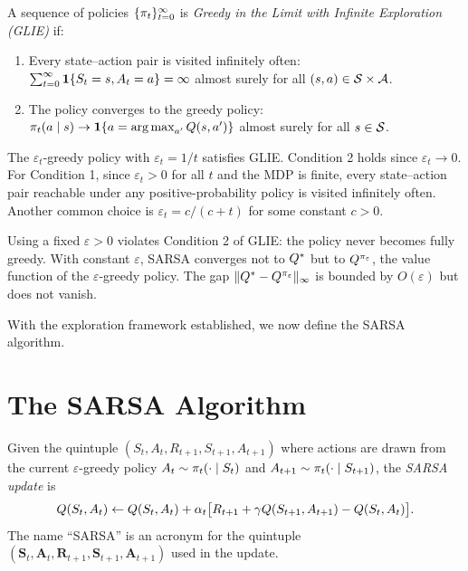\documentclass[11pt,a4paper]{article}
\begin{document}
\begin{definition}
\label{def:glie}
A sequence of policies $\{\pi_t\}_{t=0}^\infty$ is
\emph{Greedy in the Limit with Infinite Exploration (GLIE)} if:
\begin{enumerate}[nosep]
  \item Every state--action pair is visited infinitely often:
    $\sum_{t=0}^\infty \mathbf{1}\{S_t = s, A_t = a\} = \infty$
    almost surely for all $(s,a) \in \mathcal{S} \times \mathcal{A}$.
  \item The policy converges to the greedy policy:
    $\pi_t(a \mid s) \to \mathbf{1}\{a = \operatorname{arg\,max}_{a'} Q(s,a')\}$
    almost surely for all $s \in \mathcal{S}$.
\end{enumerate}
\end{definition}

\begin{example}
\label{ex:glie_schedule}
The $\varepsilon_t$-greedy policy with $\varepsilon_t = 1/t$
satisfies GLIE. Condition 2 holds since $\varepsilon_t \to 0$.
For Condition 1, since $\varepsilon_t > 0$ for all $t$ and the
MDP is finite, every state--action pair reachable under any
positive-probability policy is visited infinitely often.
Another common choice is $\varepsilon_t = c/(c + t)$ for some
constant $c > 0$.
\end{example}

\begin{warning}[title={Constant $\varepsilon$ Does Not Satisfy GLIE}]
Using a fixed $\varepsilon > 0$ violates Condition 2 of GLIE: the
policy never becomes fully greedy. With constant $\varepsilon$,
SARSA converges not to $Q^*$ but to $Q^{\pi_\varepsilon}$,
the value function of the $\varepsilon$-greedy policy. The gap
$\|Q^* - Q^{\pi_\varepsilon}\|_\infty$ is bounded by
$O(\varepsilon)$ but does not vanish.
\end{warning}

With the exploration framework established, we now define the SARSA
algorithm.

\section{The SARSA Algorithm}
\label{sec:sarsa}

\begin{definition}
\label{def:sarsa}
Given the quintuple $(S_t, A_t, R_{t+1}, S_{t+1}, A_{t+1})$ where
actions are drawn from the current $\varepsilon$-greedy policy
$A_t \sim \pi_t(\cdot \mid S_t)$ and
$A_{t+1} \sim \pi_t(\cdot \mid S_{t+1})$, the \emph{SARSA
update} is
\begin{equation}
  Q(S_t, A_t) \leftarrow Q(S_t, A_t)
  + \alpha_t\bigl[R_{t+1} + \gamma Q(S_{t+1}, A_{t+1})
  - Q(S_t, A_t)\bigr].
  \label{eq:sarsa}
\end{equation}
The name ``SARSA'' is an acronym for the quintuple
$(\mathbf{S}_t, \mathbf{A}_t, \mathbf{R}_{t+1},
\mathbf{S}_{t+1}, \mathbf{A}_{t+1})$ used in the update.
\end{definition}
\end{document}
